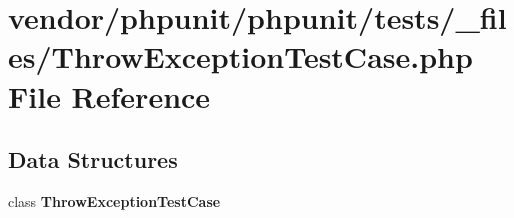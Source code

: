 \section{vendor/phpunit/phpunit/tests/\+\_\+files/\+Throw\+Exception\+Test\+Case.php File Reference}
\label{_throw_exception_test_case_8php}
\subsection*{Data Structures}
\begin{DoxyCompactItemize}
\item 
class {\bf Throw\+Exception\+Test\+Case}
\end{DoxyCompactItemize}
